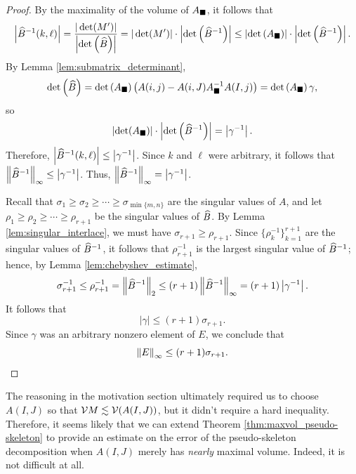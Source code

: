 \documentclass{article}
\begin{document}
\begin{proof}
		By the maximality of the volume of $A_\blacksquare$, it follows that
		\begin{equation}
			\left|\widehat{B}^{-1}(k,\ell)\right| = \frac{|\det(M')|}{\left|\det\left(\widehat{B}\right)\right|} =|\det(M')|\cdot \left|\det\left(\widehat{B}^{-1}\right)\right| \le \left|\det\left(A_\blacksquare\right)\right|\cdot \left|\det\left(\widehat{B}^{-1}\right)\right|.
		\end{equation}
		By Lemma \ref{lem:submatrix_determinant},
		\begin{equation}
			\det\left(\widehat{B}\right) = \det\left(A_\blacksquare\right)\left(A(i,j)-A(i,J)A_\blacksquare^{-1}A(I,j)\right) = \det\left(A_\blacksquare\right)\gamma,
		\end{equation}
		so
		\begin{equation}
			\left|\det(A_\blacksquare)\right|\cdot \left|\det\left(\widehat{B}^{-1}\right)\right| = \left|\gamma^{-1}\right|.
		\end{equation}
		Therefore, $\left|\widehat{B}^{-1}(k,\ell)\right| \le \left|\gamma^{-1}\right|$. Since $k$ and $\ell$ were arbitrary, it follows that $\left\lVert \widehat{B}^{-1} \right\rVert_\infty \le \left|\gamma^{-1}\right|$. Thus, $\left\lVert \widehat{B}^{-1} \right\rVert_\infty = \left|\gamma^{-1}\right|$.
		
		Recall that $\sigma_1 \ge \sigma_2 \ge \cdots \ge \sigma_{\min\{m,n\}}$ are the singular values of $A$, and let $\rho_1 \ge \rho_2 \ge \cdots \ge \rho_{r+1}$ be the singular values of $\widehat{B}$. By Lemma \ref{lem:singular_interlace}, we must have $\sigma_{r+1} \ge \rho_{r+1}$. Since $\{\rho_k^{-1}\}_{k=1}^{r+1}$ are the singular values of $\widehat{B}^{-1}$, it follows that $\rho_{r+1}^{-1}$ is the largest singular value of $\widehat{B}^{-1}$; hence, by Lemma \ref{lem:chebyshev_estimate},
		\begin{equation}
			\sigma_{r+1}^{-1} \le \rho_{r+1}^{-1} = \left\lVert \widehat{B}^{-1} \right\rVert_2 \le (r+1)\left\lVert \widehat{B}^{-1} \right\rVert_\infty = (r+1)\left|\gamma^{-1}\right|.
		\end{equation}
		It follows that
		\begin{equation}
			|\gamma| \le (r+1)\sigma_{r+1}.
		\end{equation}
		Since $\gamma$ was an arbitrary nonzero element of $E$, we conclude that
		\begin{equation}
			\left\lVert E \right\rVert_\infty \le (r+1)\sigma_{r+1}.
		\end{equation}
	\end{proof}
	
	The reasoning in the motivation section ultimately required us to choose $A(I,J)$ so that $\mathcal{V}{M} \lesssim \mathcal{V}(A(I,J))$, but it didn't require a hard inequality. Therefore, it seems likely that we can extend Theorem \ref{thm:maxvol_pseudo-skeleton} to provide an estimate on the error of the pseudo-skeleton decomposition when $A(I,J)$ merely has \textit{nearly} maximal volume. Indeed, it is not difficult at all.
	
\end{document}
